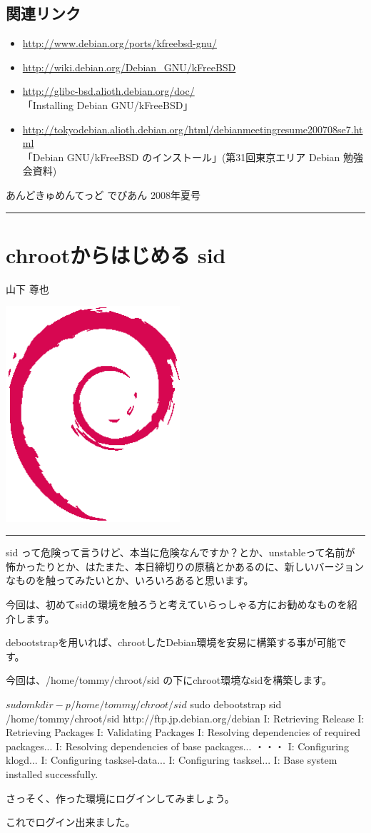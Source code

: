 \documentclass[mingoth,a4paper]{jsarticle}
\renewcommand{\dancersection}[2]{%
\newpage
あんどきゅめんてっど でびあん 2008年夏号
%
\vspace{0.1mm}\\
{\color{dancerlightblue}\rule{\hsize}{2mm}}

%
%
\begin{minipage}[t]{0.6\hsize}
\color{dancerdarkblue}
\vspace{1cm}
\section{#1}
\hfill{}#2\\
\end{minipage}
\begin{minipage}[t]{0.4\hsize}
\vspace{-2cm}
\hfill{}\includegraphics[height=8cm]{image200502/openlogo-nd.eps}\\
\vspace{-5cm}
\end{minipage}
%
%
{\color{dancerdarkblue}\rule{0.74\hsize}{2mm}}
%
\vspace{2cm}
}
\begin{document}
\subsection{関連リンク}

\begin{itemize}
\item \url{http://www.debian.org/ports/kfreebsd-gnu/}
\item \url{http://wiki.debian.org/Debian_GNU/kFreeBSD}
\item \url{http://glibc-bsd.alioth.debian.org/doc/} \\
  「Installing Debian GNU/kFreeBSD」
\item \url{http://tokyodebian.alioth.debian.org/html/debianmeetingresume200708se7.html} \\
  「Debian GNU/kFreeBSD のインストール」(第31回東京エリア Debian 勉強会資料)
\end{itemize}

\dancersection{chrootからはじめる sid}{山下 尊也}

sid って危険って言うけど、本当に危険なんですか？とか、unstableって名前が
怖かったりとか、はたまた、本日締切りの原稿とかあるのに、新しいバージョン
なものを触ってみたいとか、いろいろあると思います。

今回は、初めてsidの環境を触ろうと考えていらっしゃる方にお勧めなものを紹介します。

debootstrapを用いれば、chrootしたDebian環境を安易に構築する事が可能です。

今回は、/home/tommy/chroot/sid の下にchroot環境なsidを構築します。

\begin{commandline}
 $ sudo mkdir -p /home/tommy/chroot/sid
 $ sudo debootstrap sid /home/tommy/chroot/sid http://ftp.jp.debian.org/debian
I: Retrieving Release
I: Retrieving Packages
I: Validating Packages
I: Resolving dependencies of required packages...
I: Resolving dependencies of base packages...
・・・
I: Configuring klogd...
I: Configuring tasksel-data...
I: Configuring tasksel...
I: Base system installed successfully.
\end{commandline}

さっそく、作った環境にログインしてみましょう。


これでログイン出来ました。
\end{document}
